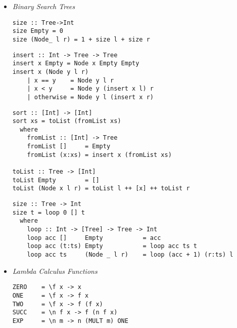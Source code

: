 \documentclass[landscape,8pt]{extarticle}
\begin{document}
\begin{multicols}{3}
\begin{itemize}
              \begin{lstlisting}
digitsOfInt :: Int -> [Int]
digitsOfInt n
    | n < 0     = []
    | n < 10    = [n]
    | otherwise = digitsOfInt (div n 10) ++ [mod n 10]

digits :: Int -> [Int]
digits n = digitsOfInt (abs n)
\end{lstlisting}
              \begin{lstlisting}
additivePersistence :: Int -> Int
additivePersistence n~
    | n < 10    = 0
    | otherwise = 1 + additivePersistence (sumList (digitsOfInt n))
\end{lstlisting}
              \begin{lstlisting}
digitalRoot :: Int -> Int
digitalRoot n
    | n < 10    = n
    | otherwise = digitalRoot (sumList (digitsOfInt n))
\end{lstlisting}
              \begin{lstlisting}
listReverse :: [a] -> [a]
listReverse []      = []
listReverse (x:xs)  = listReverse xs ++ [x]
\end{lstlisting}
        \item \emph{Binary Search Trees}
              \begin{lstlisting}
size :: Tree->Int
size Empty = 0
size (Node_ l r) = 1 + size l + size r
\end{lstlisting}
              \begin{lstlisting}
insert :: Int -> Tree -> Tree
insert x Empty = Node x Empty Empty
insert x (Node y l r)
    | x == y    = Node y l r
    | x < y     = Node y (insert x l) r
    | otherwise = Node y l (insert x r)
\end{lstlisting}
              \begin{lstlisting}
sort :: [Int] -> [Int]
sort xs = toList (fromList xs)
  where
    fromList :: [Int] -> Tree
    fromList []     = Empty
    fromList (x:xs) = insert x (fromList xs)

toList :: Tree -> [Int]
toList Empty        = []
toList (Node x l r) = toList l ++ [x] ++ toList r
\end{lstlisting}
              \begin{lstlisting}
size :: Tree -> Int
size t = loop 0 [] t
  where
    loop :: Int -> [Tree] -> Tree -> Int
    loop acc []     Empty           = acc
    loop acc (t:ts) Empty           = loop acc ts t
    loop acc ts     (Node _ l r)    = loop (acc + 1) (r:ts) l
\end{lstlisting}
        \item \emph{Lambda Calculus Functions}
              \begin{lstlisting}
ZERO    = \f x -> x
ONE     = \f x -> f x
TWO     = \f x -> f (f x)
SUCC    = \n f x -> f (n f x)
EXP     = \n m -> n (MULT m) ONE


\end{lstlisting}
\end{itemize}
\end{multicols}
\end{document}
